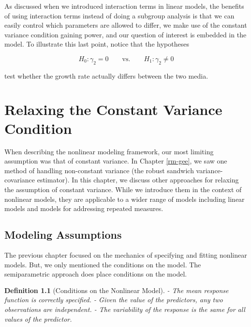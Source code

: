 \documentclass[
]{book}
\theoremstyle{plain}
\theoremstyle{mydefn}
\newtheorem{definition}{Definition}[chapter]
\theoremstyle{myexmpl}
\theoremstyle{remark}
\begin{document}
As discussed when we introduced interaction terms in linear models, the benefits of using interaction terms instead of doing a subgroup analysis is that we can easily control which parameters are allowed to differ, we make use of the constant variance condition gaining power, and our question of interest is embedded in the model. To illustrate this last point, notice that the hypotheses

\[H_0: \gamma_2 = 0 \qquad \text{vs.} \qquad H_1: \gamma_2 \neq 0\]

test whether the growth rate actually differs between the two media.

\hypertarget{nlm-heteroskedasticity}{%
\chapter{Relaxing the Constant Variance Condition}\label{nlm-heteroskedasticity}}

When describing the nonlinear modeling framework, our most limiting assumption was that of constant variance. In Chapter \ref{rm-gee}, we saw one method of handling non-constant variance (the robust sandwich variance-covariance estimator). In this chapter, we discuss other approaches for relaxing the assumption of constant variance. While we introduce them in the context of nonlinear models, they are applicable to a wider range of models including linear models and models for addressing repeated measures.

\hypertarget{modeling-assumptions}{%
\section{Modeling Assumptions}\label{modeling-assumptions}}

The previous chapter focused on the mechanics of specifying and fitting nonlinear models. But, we only mentioned the conditions on the model. The semiparametric approach does place conditions on the model.

\begin{definition}[Conditions on the Nonlinear Model]
\protect\hypertarget{def:defn-nlm-conditions}{}{\label{def:defn-nlm-conditions} {} }- The mean response function is correctly specified.
- Given the value of the predictors, any two observations are independent.
- The variability of the response is the same for all values of the predictor.
\end{definition}
\end{document}
